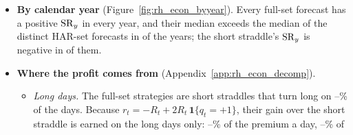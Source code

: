 \begin{itemize}
\item \textbf{By calendar year} (Figure~\ref{fig:rh_econ_byyear}). Every full-set forecast has a positive $\mathrm{SR}_y$ in
  every year, and their median exceeds the median of the \rhemHarDistinctWord{} distinct HAR-set forecasts in
  \rhemYearsFullMedAboveHarMedWord{} of the \rhemNYearsWord{} years; the short straddle's $\mathrm{SR}_y$ is negative in
  \rhemYearsShortNegWord{} of them.
\item \textbf{Where the profit comes from} (Appendix~\ref{app:rh_econ_decomp}).
  \begin{itemize}
  \item \emph{Long days.} The full-set strategies are short straddles that turn long on \rhedLongPctMin--\rhedLongPctMax\%
    of the days. Because $r_t = -R_t + 2R_t\,\mathbf{1}\{q_t = +1\}$, their gain over the short straddle is earned on
    the long days only: \rhedGainMin--\rhedGainMax\% of the premium a day, \rhedGainShareMin--\rhedGainShareMax\% of

\end{itemize}
\end{itemize}
